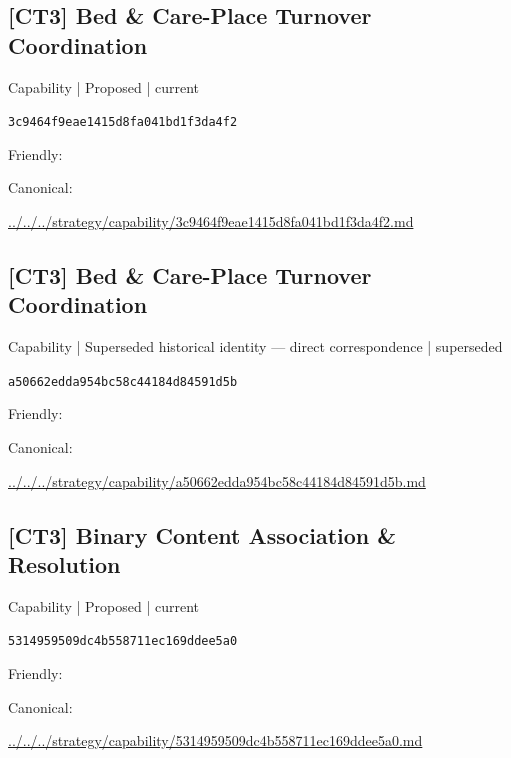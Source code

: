 \documentclass[10pt,a4paper]{article}
\begin{document}
\subsection*{[CT3] Bed \& Care-Place Turnover Coordination}
{\small Capability | Proposed | current}\par
\texttt{3c9464f9eae1415d8fa041bd1f3da4f2}\par
Friendly: \par
Canonical: \par
{\footnotesize\url{../../../strategy/capability/3c9464f9eae1415d8fa041bd1f3da4f2.md}}\par
\subsection*{[CT3] Bed \& Care-Place Turnover Coordination}
{\small Capability | Superseded historical identity — direct correspondence | superseded}\par
\texttt{a50662edda954bc58c44184d84591d5b}\par
Friendly: \par
Canonical: \par
{\footnotesize\url{../../../strategy/capability/a50662edda954bc58c44184d84591d5b.md}}\par
\subsection*{[CT3] Binary Content Association \& Resolution}
{\small Capability | Proposed | current}\par
\texttt{5314959509dc4b558711ec169ddee5a0}\par
Friendly: \par
Canonical: \par
{\footnotesize\url{../../../strategy/capability/5314959509dc4b558711ec169ddee5a0.md}}\par
\end{document}
